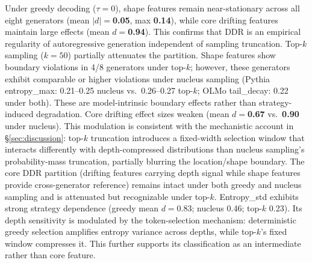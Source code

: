 Under greedy decoding ($\tau{=}0$), shape features remain near-stationary across all eight generators
(mean $|d|{=}$\textbf{0.05}, max \textbf{0.14}), while core drifting features maintain large effects
(mean $d{=}$\textbf{0.94}). This confirms that DDR is an empirical regularity of autoregressive generation
independent of sampling truncation.
Top-$k$ sampling ($k{=}50$) partially attenuates the partition.
Shape features show boundary violations in 4/8 generators under top-$k$; however, these generators exhibit comparable or higher violations under nucleus sampling (Pythia entropy\_max: 0.21--0.25 nucleus vs.\ 0.26--0.27 top-$k$; OLMo tail\_decay: 0.22 under both). These are model-intrinsic boundary effects rather than strategy-induced degradation.
Core drifting effect sizes weaken (mean $d{=}$\textbf{0.67} vs.\ \textbf{0.90} under nucleus).
This modulation is consistent with the mechanistic account in \S\ref{sec:discussion}:
top-$k$ truncation introduces a fixed-width selection window that interacts differently
with depth-compressed distributions than nucleus sampling's probability-mass truncation,
partially blurring the location/shape boundary.
The core DDR partition (drifting features carrying depth signal while shape features
provide cross-generator reference) remains intact under both greedy and nucleus sampling
and is attenuated but recognizable under top-$k$.
Entropy\_std exhibits strong strategy dependence (greedy mean $d{=}$0.83; nucleus 0.46; top-$k$ 0.23). Its depth sensitivity is modulated by the token-selection mechanism: deterministic greedy selection amplifies entropy variance across depths, while top-$k$'s fixed window compresses it. This further supports its classification as an intermediate rather than core feature.
